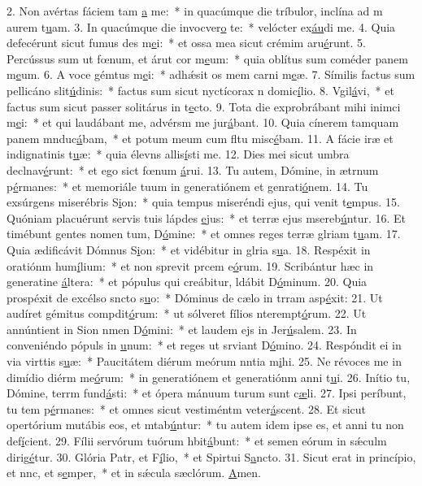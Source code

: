 2. Non avértas fáciem tam \uline{a} me:~* in quacúmque die tríbulor, inclína ad m aurem t\uline{u}am.
3. In quacúmque die invocver\uline{o} te:~* velócter ex\uline{áu}di me.
4. Quia defecérunt sicut fumus des m\uline{e}i:~* et ossa mea sicut crémim aru\uline{é}runt.
5. Percússus sum ut fœnum, et árut cor m\uline{e}um:~* quia oblítus sum coméder panem m\uline{e}um.
6. A voce gémtus m\uline{e}i:~* adhǽsit os mem carni m\uline{e}æ.
7. Símilis factus sum pellicáno slit\uline{ú}dinis:~* factus sum sicut nyctícorax n domic\uline{í}lio.
8. Vgil\uline{á}vi,~* et factus sum sicut passer solitárus in t\uline{e}cto.
9. Tota die exprobrábant mihi inimci m\uline{e}i:~* et qui laudábant me, advérsm me jur\uline{á}bant.
10. Quia cínerem tamquam panem mnduc\uline{á}bam,~* et potum meum cum fltu misc\uline{é}bam.
11. A fácie iræ et indignatinis t\uline{u}æ:~* quia élevns allis\uline{í}sti me.
12. Dies mei sicut umbra declnav\uline{é}runt:~* et ego sict fœnum \uline{á}rui.
13. Tu autem, Dómine, in ætrnum p\uline{é}rmanes:~* et memoriále tuum in generatiónem et genrati\uline{ó}nem.
14. Tu exsúrgens miserébris S\uline{i}on:~* quia tempus miseréndi ejus, qui venit t\uline{e}mpus.
15. Quóniam placuérunt servis tuis lápdes \uline{e}jus:~* et terræ ejus msereb\uline{ú}ntur.
16. Et timébunt gentes nomen tum, D\uline{ó}mine:~* et omnes reges terræ glriam t\uline{u}am.
17. Quia ædificávit Dómnus S\uline{i}on:~* et vidébitur in glria s\uline{u}a.
18. Respéxit in oratiónm hum\uline{í}lium:~* et non sprevit prcem e\uline{ó}rum.
19. Scribántur hæc in generatine \uline{á}ltera:~* et pópulus qui creábitur, ldábit D\uline{ó}minum.
20. Quia prospéxit de excélso sncto s\uline{u}o:~* Dóminus de cælo in trram asp\uline{é}xit:
21. Ut audíret gémitus compdit\uline{ó}rum:~* ut sólveret fílios nterempt\uline{ó}rum.
22. Ut annúntient in Sion nmen D\uline{ó}mini:~* et laudem ejs in Jer\uline{ú}salem.
23. In conveniéndo pópuls in \uline{u}num:~* et reges ut srviant D\uline{ó}mino.
24. Respóndit ei in via virttis s\uline{u}æ:~* Paucitátem diérum meórum nntia m\uline{i}hi.
25. Ne révoces me in dimídio diérm me\uline{ó}rum:~* in generatiónem et generatiónm anni t\uline{u}i.
26. Inítio tu, Dómine, terrm fund\uline{á}sti:~* et ópera mánuum turum sunt c\uline{æ}li.
27. Ipsi períbunt, tu tem p\uline{é}rmanes:~* et omnes sicut vestiméntm veter\uline{á}scent.
28. Et sicut opertórium mutábis eos, et mtab\uline{ú}ntur:~* tu autem idem ipse es, et anni tu non def\uline{í}cient.
29. Fílii servórum tuórum hbit\uline{á}bunt:~* et semen eórum in sǽculm dirig\uline{é}tur.
30. Glória Patr, et F\uline{í}lio,~* et Spirtui S\uline{a}ncto.
31. Sicut erat in princípio, et nnc, et s\uline{e}mper,~* et in sǽcula sæclórum. \uline{A}men.
